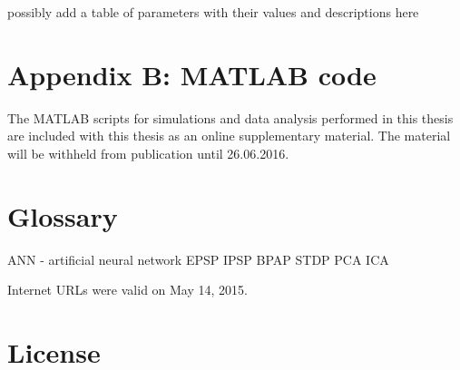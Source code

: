 \documentclass[a4paper,12pt]{report}
\theoremstyle{definition}
\begin{document}
possibly add a table of parameters with their values and descriptions here

\chapter*{Appendix B: MATLAB code}
\label{appendix:code}

The MATLAB scripts for simulations and data analysis performed in this thesis are included with this thesis as an online supplementary material. The material will be withheld from publication until 26.06.2016.







\chapter*{Glossary}
ANN - artificial neural network
EPSP
IPSP
BPAP
STDP
PCA
ICA





Internet URLs were valid on May 14, 2015.
\newpage



\chapter*{License}


%
%
\end{document}

